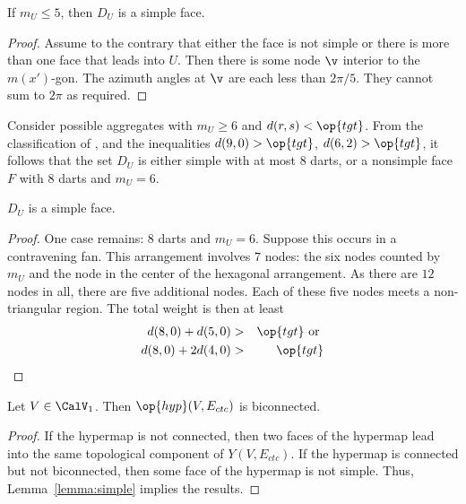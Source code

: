 \begin{lemma}[]\label{lemma:DU} If $m_U\le 5$, then 
$D_U$ is a simple face.
\end{lemma}
%

\begin{proof} Assume to the contrary that either the face is not
  simple or there is more than one face that leads into $U$.  Then
  there is some node $\v$ interior to the $m(x')$-gon.  The azimuth
  angles at $\v$ are each less than $2\pi/5$. They cannot sum to $2\pi$
  as required.
\end{proof}

Consider possible aggregates with $m_U\ge 6$ and $d(r,s)<\op{tgt}$.
From the classification of \cite[p.~126,~Fig.~12.1]{Hales:2006:DCG},
and the inequalities $d(9,0) > \op{tgt}$, $d(6,2) > \op{tgt}$, it
follows that the set $D_U$ is either simple with at most $8$ darts, or
a nonsimple face $F$ with $8$ darts and $m_U=6$.

\begin{lemma}[]\label{lemma:simple} $D_U$ is a
simple face.
\end{lemma}
%
%

\begin{proof} One case remains: $8$ darts and $m_U=6$.  Suppose this
  occurs in a contravening fan.  This arrangement involves $7$ nodes:
  the six nodes counted by $m_U$ and the node in the center of the
  hexagonal arrangement.  As there are $12$ nodes in all, there are
  five additional nodes.  Each of these five nodes meets a
  non-triangular region.  The total weight is then at least
\begin{eqnarray*}
d(8,0) + d(5,0) &>& \op{tgt}\hbox{ or }\\
d(8,0) + 2 d(4,0) &>& \op{tgt}\\
\end{eqnarray*}
\end{proof}
%
%

\begin{lemma}[biconnected]\label{lemma:biconnected}
Let $V\in \CalV_1$.  Then $\op{hyp}(V,E_{ctc})$ is biconnected.
\end{lemma}

\begin{proof}
  If the hypermap is not connected, then two faces of the hypermap
  lead into the same topological component of $Y(V,E_{ctc})$.  If the
  hypermap is connected but not biconnected, then some face of the
  hypermap is not simple.  Thus, Lemma~\ref{lemma:simple} implies the
  results.
\end{proof}




